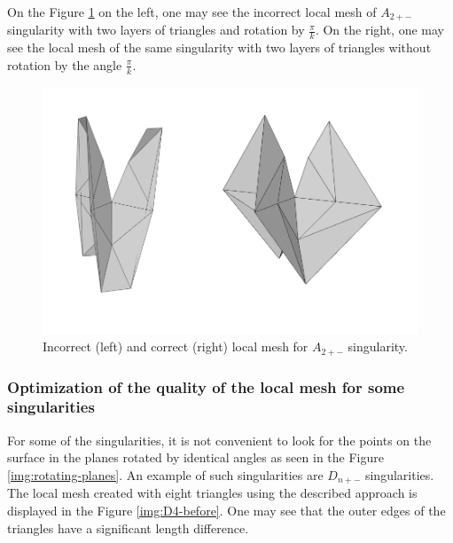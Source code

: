 On the Figure \ref{img:55} on the left, one may see the incorrect local mesh
of $A_{2+-}$ singularity with
two layers of triangles and rotation by $\frac{\pi}{k}$. On the right, one
may see the local mesh of the same singularity with two layers of triangles
without rotation by the angle $\frac{\pi}{k}$.

\begin{figure}
    \centerline{\includegraphics[scale=0.4]{images/img55}}
    \caption[Incorrect and correct local mesh]
    {Incorrect (left) and correct (right) local mesh for $A_{2+-}$ singularity.}
    \label{img:55}
\end{figure}


\subsubsection*{Optimization of the quality of the local mesh for some singularities}
For some of the singularities, it is not convenient to look for the points on
the surface in the planes rotated by identical angles as seen in the Figure
\ref{img:rotating-planes}. An example of such singularities are $D_{n+-}$
singularities. The local mesh created with eight triangles using the described 
approach is displayed in the Figure \ref{img:D4-before}. One may see that the
outer edges of the triangles have a significant length difference.

